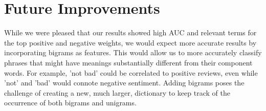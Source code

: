 \documentclass{article}
\begin{document}
\section{Future Improvements}

While we were pleased that our results showed high AUC and relevant terms for the top positive and negative weights, we would expect more accurate results by incorporating bigrams as features. This would allow us to more accurately classify phrases that might have meanings substantially different from their component words. For example, 'not bad' could be correlated to positive reviews, even while 'not' and 'bad' would connote negative sentiment. Adding bigrams poses the challenge of creating a new, much larger, dictionary to keep track of the occurrence of both bigrams and unigrams.



\end{document}
